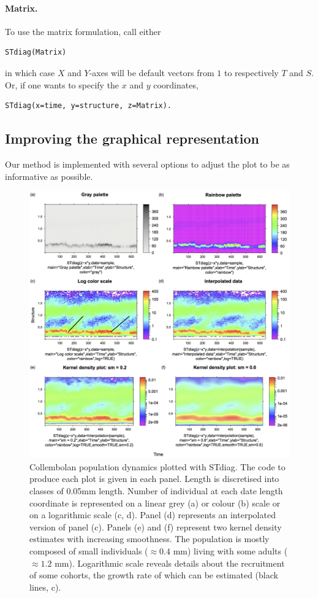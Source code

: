 \paragraph{Matrix.}
To use the matrix formulation, call either
\begin{verbatim}
STdiag(Matrix)
\end{verbatim}
in which case $X$ and $Y$-axes will be default vectors from $1$ to respectively
$T$ and $S$. Or, if one wants to specify the $x$ and $y$ coordinates,
\begin{verbatim}
STdiag(x=time, y=structure, z=Matrix).
\end{verbatim}

\subsection{Improving the graphical representation}

Our method is implemented with several options to adjust the plot to be as
informative as possible.

\begin{figure}[!h] %
\centering
\includegraphics[height=0.70\textheight]{2_Methodo/Fig/Fig22-2}
\caption[Collembolan population dynamics plotted
with STdiag]{ Collembolan population dynamics plotted with STdiag. The code to produce each plot is given in each panel. Length is discretised into classes of
0.05mm length. Number of individual at each date length coordinate is
represented on a linear grey (a) or colour (b) scale or on a logarithmic scale
(c, d). Panel (d) represents an interpolated version of panel (c). Panels (e)
and (f) represent two kernel density estimates with increasing smoothness. The
population is mostly composed of small individuals ($\approx0.4$ mm) living with some
adults ($\approx1.2$ mm). Logarithmic scale reveals details about the recruitment of
some cohorts, the growth rate of which can be estimated (black lines, c).
}
\label{Fig22-2}
\end{figure}

